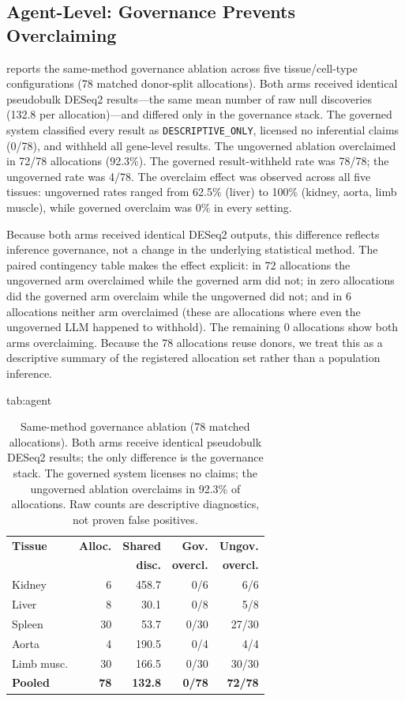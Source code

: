 \documentclass[pmlr,twocolumn,10pt]{jmlr}
\begin{document}
\subsection{Agent-Level: Governance Prevents Overclaiming}
\label{sec:agentpilot}

 reports the same-method governance ablation across five
tissue/cell-type configurations (78 matched donor-split allocations). Both arms
received identical pseudobulk DESeq2 results---the same mean number of raw null
discoveries (132.8 per allocation)---and differed only in the governance stack.
The governed system classified every result as \texttt{DESCRIPTIVE\_ONLY},
licensed no inferential claims (0/78), and withheld all gene-level results. The
ungoverned ablation overclaimed in 72/78 allocations (92.3\%).
The governed result-withheld rate was 78/78; the ungoverned rate
was 4/78. The overclaim effect was observed across all five tissues: ungoverned
rates ranged from 62.5\% (liver) to 100\% (kidney, aorta, limb muscle), while
governed overclaim was 0\% in every setting.

Because both arms received identical DESeq2 outputs, this difference reflects
inference governance, not a change in the underlying statistical method.
The paired contingency table makes the effect explicit: in 72 allocations the
ungoverned arm overclaimed while the governed arm did not; in zero allocations
did the governed arm overclaim while the ungoverned did not; and in 6
allocations neither arm overclaimed (these are allocations where even the
ungoverned LLM happened to withhold). The remaining 0 allocations show both
arms overclaiming. Because the 78 allocations reuse donors, we treat this as a
descriptive summary of the registered allocation set rather than a population
inference.

\begin{table}[htbp]
\floatconts
  {tab:agent}
  {\caption{Same-method governance ablation (78 matched allocations). Both arms
  receive identical pseudobulk DESeq2 results; the only difference is the
  governance stack. The governed system licenses no claims; the ungoverned
  ablation overclaims in 92.3\% of allocations. Raw counts are descriptive
  diagnostics, not proven false positives.}}
  {\small
  \begin{tabular}{lrrrr}
  \toprule
  \textbf{Tissue} & \textbf{Alloc.} & \textbf{Shared} & \textbf{Gov.} & \textbf{Ungov.} \\
  & & \textbf{disc.} & \textbf{overcl.} & \textbf{overcl.} \\
  \midrule
  Kidney   & 6  & 458.7 & 0/6  & 6/6 \\
  Liver    & 8  & 30.1  & 0/8  & 5/8 \\
  Spleen   & 30 & 53.7  & 0/30 & 27/30 \\
  Aorta    & 4  & 190.5 & 0/4  & 4/4 \\
  Limb musc. & 30 & 166.5 & 0/30 & 30/30 \\
  \midrule
  \textbf{Pooled} & \textbf{78} & \textbf{132.8} & \textbf{0/78} & \textbf{72/78} \\
  \bottomrule
  \end{tabular}}
\end{table}
\end{document}
